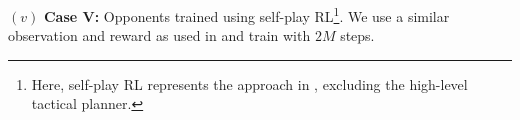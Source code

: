\noindent \((v)\) \textbf{Case V:} Opponents trained using self-play RL\footnote{Here, self-play RL represents the approach in \cite{thakkar2022hierarchical}, excluding the high-level tactical planner.}. We use a similar observation and reward as used in \cite{thakkar2022hierarchical} and train with \(2M\) steps.



